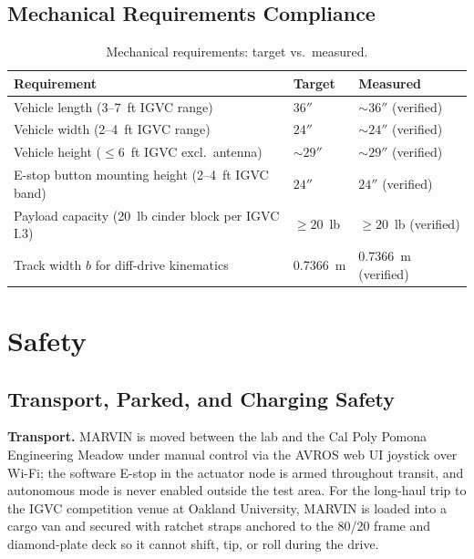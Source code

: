 \documentclass[12pt, letterpaper]{article}
\begin{document}
\subsection{Mechanical Requirements Compliance}

\begin{table}[H]
    \centering
    \small
    \caption{Mechanical requirements: target vs.\ measured.}
    \begin{tabularx}{\textwidth}{X l l}
        \toprule
        \textbf{Requirement} & \textbf{Target} & \textbf{Measured} \\
        \midrule
        Vehicle length (3--7~ft IGVC range)                  & $36''$       & $\sim 36''$ (verified) \\
        Vehicle width (2--4~ft IGVC range)                   & $24''$       & $\sim 24''$ (verified) \\
        Vehicle height ($\leq 6$~ft IGVC excl.\ antenna)     & $\sim 29''$  & $\sim 29''$ (verified) \\
        E-stop button mounting height (2--4~ft IGVC band)    & $24''$       & $24''$ (verified) \\
        Payload capacity (20~lb cinder block per IGVC I.3)   & $\geq 20$~lb & $\geq 20$~lb (verified) \\
        Track width $b$ for diff-drive kinematics            & 0.7366~m     & 0.7366~m (verified) \\
        \bottomrule
    \end{tabularx}
\end{table}

\section{Safety}
\label{sec:safety}

\subsection{Transport, Parked, and Charging Safety}

\textbf{Transport.} MARVIN is moved between the lab and the Cal Poly Pomona Engineering
Meadow under manual control via the AVROS web UI joystick over Wi-Fi; the software
E-stop in the actuator node is armed throughout transit, and autonomous mode is never
enabled outside the test area. For the long-haul trip to the IGVC competition venue at
Oakland University, MARVIN is loaded into a cargo van and secured with ratchet straps
anchored to the 80/20 frame and diamond-plate deck so it cannot shift, tip, or roll
during the drive.
\end{document}
